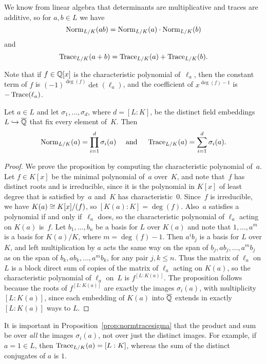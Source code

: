 We know from linear algebra that
determinants are multiplicative
and traces are additive, so for $a,b\in L$ we have
$$\operatorname{Norm}_{L/K}(ab) = \operatorname{Norm}_{L/K}(a)\cdot \operatorname{Norm}_{L/K}(b)$$
and
$$\operatorname{Trace}_{L/K}(a+b) = \operatorname{Trace}_{L/K}(a) + \operatorname{Trace}_{L/K}(b).$$

Note that if $f\in\mathbb{Q}[x]$ is the characteristic polynomial of~$\ell_a$,
then the constant term of $f$ is $(-1)^{\deg(f)}\det(\ell_a)$, and the
coefficient of $x^{\deg(f)-1}$ is $-\operatorname{Trace}(\ell_a)$.

\begin{proposition}\label{prop:normtracesigma}
  Let $a\in L$ and let $\sigma_1,\dots, \sigma_d$, where $d=[L:K]$, be
  the distinct field embeddings $L \hookrightarrow \overline{\mathbb{Q}}$ that fix every element
  of~$K$.  Then
  \[
    \operatorname{Norm}_{L/K}(a) = \prod_{i=1}^d \sigma_i(a)
    \quad\text{ and }\quad
    \operatorname{Trace}_{L/K}(a) = \sum_{i=1}^d \sigma_i(a).
  \]
\end{proposition}
\begin{proof}
  We prove the proposition by computing the characteristic
  polynomial of~$a$.  Let $f\in K[x]$ be the minimal polynomial
  of~$a$ over~$K$, and note that~$f$ has distinct roots and is
  irreducible, since it is the polynomial in $K[x]$ of least degree
  that is satisfied by~$a$ and~$K$ has characteristic~$0$.  Since~$f$
  is irreducible, we have $K(a) \cong K[x]/(f)$, so $[K(a):K]=\deg(f)$.
  Also~$a$ satisfies a polynomial if and only if~$\ell_a$ does, so the
  characteristic polynomial of $\ell_a$ acting on $K(a)$ is~$f$.  Let
  $b_1,\dots,b_n$ be a basis for $L$ over $K(a)$ and note that
  $1,\dots, a^m$ is a basis for $K(a)/K$, where $m=\deg(f)-1$.  Then
  $a^i b_j$ is a basis for $L$ over $K$, and left multiplication by
  $a$ acts the same way on the span of $b_j, a b_j, \dots, a^m b_j$
  as on the span of $b_k, a b_k, \dots, a^m b_k$, for any pair
  $j,k \leq n$.  Thus the matrix of $\ell_a$ on $L$ is a block direct sum
  of copies of the matrix of $\ell_a$ acting on $K(a)$, so the
  characteristic polynomial of $\ell_a$ on~$L$ is $f^{[L:K(a)]}$.  The
  proposition follows because the roots of $f^{[L:K(a)]}$ are exactly
  the images $\sigma_i(a)$, with multiplicity $[L:K(a)]$, since each
  embedding of $K(a)$ into $\overline{\mathbb{Q}}$ extends in exactly $[L:K(a)]$ ways
  to $L$.
\end{proof}

\begin{warning}
  It is important in Proposition~\ref{prop:normtracesigma} that
  the product and sum be over {\em all} the images $\sigma_i(a)$,
  not over just the distinct images.  For example, if $a=1\in L$, then
  $\operatorname{Trace}_{L/K}(a) = [L:K]$, whereas the sum of the distinct conjugates
  of $a$ is $1$.
\end{warning}

